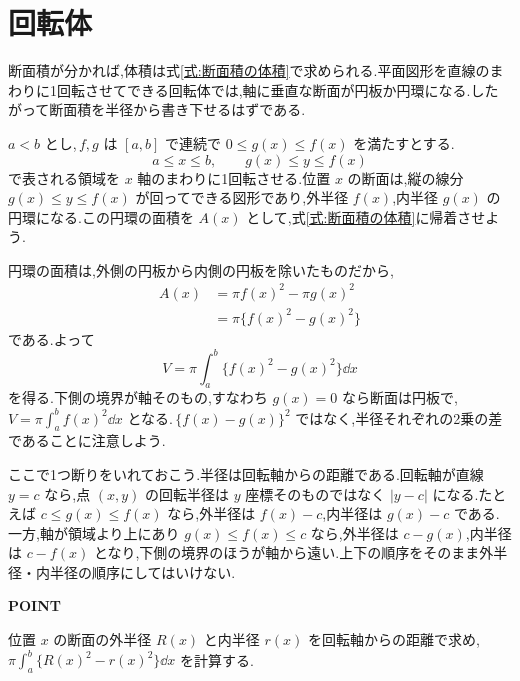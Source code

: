 \section{回転体}\label{節:回転体の体積}

断面積が分かれば,体積は式\eqref{式:断面積の体積}で求められる.平面図形を直線のまわりに1回転させてできる回転体では,軸に垂直な断面が円板か円環になる.したがって断面積を半径から書き下せるはずである.

$a<b$ とし,\,$f,g$ は $[a,b]$ で連続で $0\le g(x)\le f(x)$ を満たすとする.
\[
a\le x\le b,\qquad g(x)\le y\le f(x)
\]
で表される領域を $x$ 軸のまわりに1回転させる.位置 $x$ の断面は,縦の線分 $g(x)\le y\le f(x)$ が回ってできる図形であり,外半径 $f(x)$,内半径 $g(x)$ の円環になる.この円環の面積を $A(x)$ として,式\eqref{式:断面積の体積}に帰着させよう.

円環の面積は,外側の円板から内側の円板を除いたものだから,
\begin{align*}
A(x)&=\pi f(x)^2-\pi g(x)^2\\
 &=\pi\{f(x)^2-g(x)^2\}
\end{align*}
である.よって
\begin{equation}\label{式:円環断面の体積}
V=\pi\int_a^b\{f(x)^2-g(x)^2\}\dd x
\end{equation}
を得る.下側の境界が軸そのもの,すなわち $g(x)=0$ なら断面は円板で,\,$V=\pi\int_a^b f(x)^2\dd x$ となる.\,$\{f(x)-g(x)\}^2$ ではなく,半径それぞれの2乗の差であることに注意しよう.

ここで1つ断りをいれておこう.半径は回転軸からの距離である.回転軸が直線 $y=c$ なら,点 $(x,y)$ の回転半径は $y$ 座標そのものではなく $|y-c|$ になる.たとえば $c\le g(x)\le f(x)$ なら,外半径は $f(x)-c$,内半径は $g(x)-c$ である.一方,軸が領域より上にあり $g(x)\le f(x)\le c$ なら,外半径は $c-g(x)$,内半径は $c-f(x)$ となり,下側の境界のほうが軸から遠い.上下の順序をそのまま外半径・内半径の順序にしてはいけない.

\begin{bookpoint}
\textbf{POINT}\par
位置 $x$ の断面の外半径 $R(x)$ と内半径 $r(x)$ を回転軸からの距離で求め,\,$\pi\int_a^b\{R(x)^2-r(x)^2\}\dd x$ を計算する.
\end{bookpoint}

%
%
